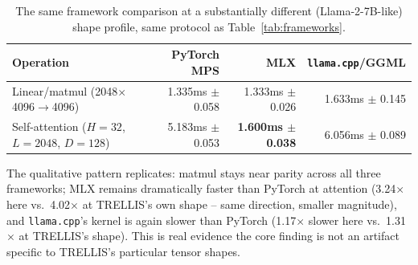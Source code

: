 \documentclass[11pt]{article}
\newcommand{\code}[1]{\texttt{#1}}
\begin{document}
\begin{table}[t]
    \centering
    \caption{The same framework comparison at a substantially different (Llama-2-7B-like) shape
    profile, same protocol as Table~\ref{tab:frameworks}.}
    \label{tab:generalization-shape}
    \begin{tabular}{@{}lrrr@{}}
        \toprule
        Operation & PyTorch MPS & MLX & \code{llama.cpp}/GGML \\
        \midrule
        Linear/matmul (2048$\times$4096$\to$4096) & 1.335ms $\pm$ 0.058 & 1.333ms $\pm$ 0.026 & 1.633ms $\pm$ 0.145 \\
        Self-attention ($H{=}32$, $L{=}2048$, $D{=}128$) & 5.183ms $\pm$ 0.053 & \textbf{1.600ms $\pm$ 0.038} & 6.056ms $\pm$ 0.089 \\
        \bottomrule
    \end{tabular}
\end{table}

The qualitative pattern replicates: matmul stays near parity across all three frameworks; MLX
remains dramatically faster than PyTorch at attention (3.24$\times$ here vs.\ 4.02$\times$ at
TRELLIS's own shape -- same direction, smaller magnitude), and \code{llama.cpp}'s kernel is again
slower than PyTorch (1.17$\times$ slower here vs.\ 1.31$\times$ at TRELLIS's shape). This is real
evidence the core finding is not an artifact specific to TRELLIS's particular tensor shapes.
\end{document}
